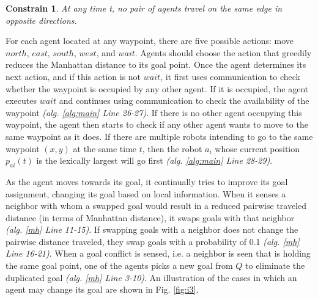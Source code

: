 \documentclass[journal]{IEEEtran}
\newtheorem{constrain}{Constrain}[subsection]
\begin{document}
\begin{constrain} At any time t, no pair of agents travel on the same edge in opposite directions.\label{cmp2}
\end{constrain} 


For each agent located at any waypoint, there are five possible actions: move $north$, $east$, $south$, $west$, and $wait$. Agents should choose the action that greedily reduces the Manhattan distance to its goal point. Once the agent determines its next action, and if this action is not $wait$, it first uses communication to check whether the waypoint is occupied by any other agent. If it is occupied, the agent executes $wait$ and continues using communication to check the availability of the waypoint \textit{(alg. \ref{alg:main} Line 26-27)}. If there is no other agent occupying this waypoint, the agent then starts to check if any other agent wants to move to the same waypoint as it does. If there are multiple robots intending to go to the same waypoint $(x, y)$ at the same time $t$, then the robot $a_i$ whose current position $p_{ai}(t)$ is the lexically largest will go first \textit{(alg. \ref{alg:main} Line 28-29)}. 

As the agent moves towards its goal, it continually tries to improve its goal assignment, changing its goal based on local information.  When it senses a neighbor with whom a swapped goal would result in a reduced  pairwise traveled distance (in terms of Manhattan distance), it swaps goals with that neighbor \textit{(alg. \ref{mh} Line 11-15)}. If swapping goals with a neighbor does not change the pairwise distance traveled, they swap goals with a probability of 0.1 \textit{(alg. \ref{mh} Line 16-21)}.  When a goal conflict is sensed, i.e. a neighbor is seen that is holding the same goal point, one of the agents picks a new goal from $Q$ to eliminate the duplicated goal \textit{(alg. \ref{mh} Line 3-10)}. An illustration of the cases in which an agent may change its goal are shown in Fig. \ref{fig:i3}.  
\end{document}
